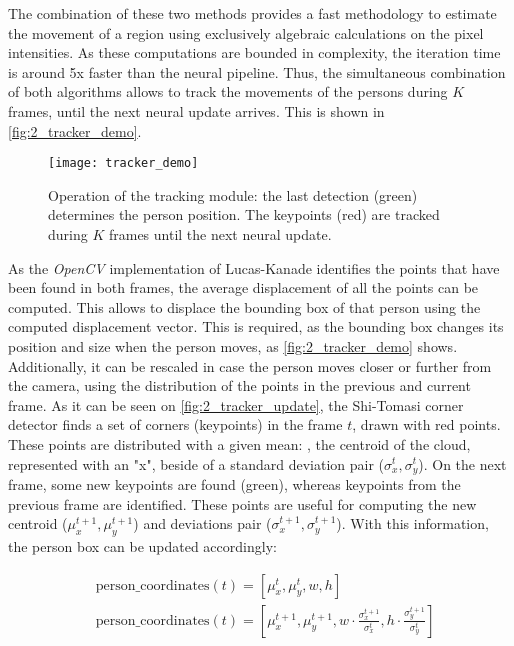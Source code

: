 The combination of these two methods provides a fast methodology to estimate the movement of a region using exclusively algebraic calculations on the pixel intensities. As these computations are bounded in complexity, the iteration time is around 5x faster than the neural pipeline. Thus, the simultaneous combination of both algorithms allows to track the movements of the persons during $K$ frames, until the next neural update arrives. This is shown in \autoref{fig:2_tracker_demo}.\\

\begin{figure}[h]
	\centering
	\texttt{[image: tracker\_demo]}
	\caption{Operation of the tracking module: the last detection (green) determines the person position. The keypoints (red) are tracked during $K$ frames until the next neural update.}
	\label{fig:2_tracker_demo}
\end{figure}

As the \textit{OpenCV} implementation of Lucas-Kanade identifies the points that have been found in both frames, the average displacement of all the points can be computed. This allows to displace the bounding box of that person using the computed displacement vector. This is required, as the bounding box changes its position and size when the person moves, as \autoref{fig:2_tracker_demo} shows. Additionally, it can be rescaled in case the person moves closer or further from the camera, using the distribution of the points in the previous and current frame. As it can be seen on \autoref{fig:2_tracker_update}, the Shi-Tomasi corner detector finds a set of corners (keypoints) in the frame $t$, drawn with red points. These points are distributed with a given mean: , the centroid of the cloud, represented with an "x", beside of a standard deviation pair ($\sigma_x^t, \sigma_y^t$). On the next frame, some new keypoints are found (green), whereas keypoints from the previous frame are identified. These points are useful for computing the new centroid ($\mu_x^{t+1}, \mu_y^{t+1}$) and deviations pair ($\sigma_x^{t+1}, \sigma_y^{t+1}$). With this information, the person box can be updated accordingly:

\begin{align*}
&\text{person\_coordinates}(t) = \left[\mu_x^{t}, \mu_y^{t}, w, h\right]\\
&\text{person\_coordinates}(t) = \left[\mu_x^{t+1}, \mu_y^{t+1}, w\cdot\frac{\sigma_x^{t+1}}{\sigma_x^t}, h\cdot\frac{\sigma_y^{t+1}}{\sigma_y^t}\right]\\
\end{align*}

